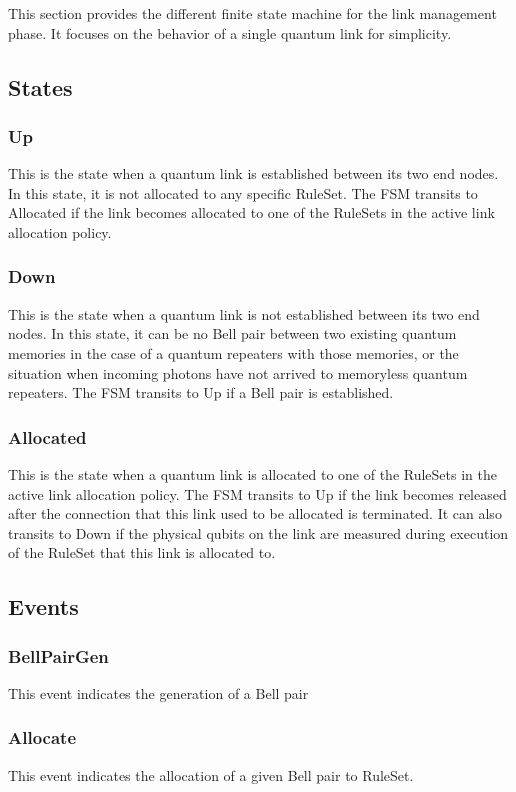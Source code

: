 This section provides the different finite state machine for the link management phase. It focuses on the behavior of a single quantum link for simplicity.

\subsection{States}

\subsubsection{Up}
This is the state when a quantum link is established between its two end nodes. In this state, it is not allocated to any specific RuleSet.
The FSM transits to Allocated if the link becomes allocated to one of the RuleSets in the active link allocation policy.

\subsubsection{Down}
This is the state when a quantum link is not established between its two end nodes. In this state, it can be no Bell pair between two existing quantum memories in the case of a quantum repeaters with those memories, or the situation when incoming photons have not arrived to memoryless quantum repeaters.
The FSM transits to Up if a Bell pair is established.

\subsubsection{Allocated}
This is the state when a quantum link is allocated to one of the RuleSets in the active link allocation policy.
The FSM transits to Up if the link becomes released after the connection that this link used to be allocated is terminated.
It can also transits to Down if the physical qubits on the link are measured during execution of the RuleSet that this link is allocated to.

\subsection{Events}

\subsubsection{BellPairGen}
This event indicates the generation of a Bell pair

\subsubsection{Allocate}
This event indicates the allocation of a given Bell pair to RuleSet.

